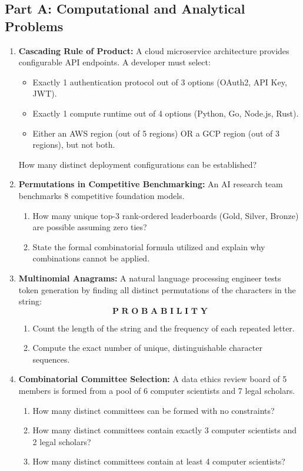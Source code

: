 \subsection*{Part A: Computational and Analytical Problems}

\begin{enumerate}
    \item \textbf{Cascading Rule of Product:} A cloud microservice architecture provides configurable API endpoints. A developer must select:
    \begin{itemize}
        \item Exactly 1 authentication protocol out of 3 options (OAuth2, API Key, JWT).
        \item Exactly 1 compute runtime out of 4 options (Python, Go, Node.js, Rust).
        \item Either an AWS region (out of 5 regions) OR a GCP region (out of 3 regions), but not both.
    \end{itemize}
    How many distinct deployment configurations can be established?

    \item \textbf{Permutations in Competitive Benchmarking:} An AI research team benchmarks 8 competitive foundation models.
    \begin{enumerate}
        \item How many unique top-3 rank-ordered leaderboards (Gold, Silver, Bronze) are possible assuming zero ties?
        \item State the formal combinatorial formula utilized and explain why combinations cannot be applied.
    \end{enumerate}

    \item \textbf{Multinomial Anagrams:} A natural language processing engineer tests token generation by finding all distinct permutations of the characters in the string:
    $$\textbf{P R O B A B I L I T Y}$$
    \begin{enumerate}
        \item Count the length of the string and the frequency of each repeated letter.
        \item Compute the exact number of unique, distinguishable character sequences.
    \end{enumerate}

    \item \textbf{Combinatorial Committee Selection:} A data ethics review board of 5 members is formed from a pool of 6 computer scientists and 7 legal scholars.
    \begin{enumerate}
        \item How many distinct committees can be formed with no constraints?
        \item How many distinct committees contain exactly 3 computer scientists and 2 legal scholars?
        \item How many distinct committees contain at least 4 computer scientists?
    \end{enumerate}


\end{enumerate}
